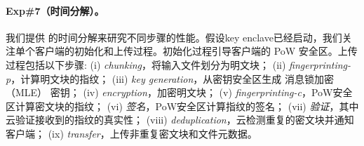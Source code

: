 \paragraph*{Exp\#7（时间分解）。} 我们提供 \sysnameS 的时间分解来研究不同步骤的性能。假设key enclave已经启动，我们关注单个客户端的初始化和上传过程。初始化过程引导客户端的 PoW 安全区。上传过程包括以下步骤: (i) \textit{ chunking}，将输入文件划分为明文块； (ii) \textit{ fingerprinting-p}，计算明文块的指纹； (iii) \textit{ key generation}，从密钥安全区生成 消息锁加密（MLE） 密钥； (iv) \textit{ encryption}，加密明文块； (v) \textit{ fingerprinting-c}，PoW安全区计算密文块的指纹； (vi) \textit{ 签名}，PoW安全区计算指纹的签名； (vii) \textit{ 验证}，其中云验证接收到的指纹的真实性； (viii) \textit{ deduplication}，云检测重复的密文块并通知客户端； (ix) \textit{ transfer}，上传非重复密文块和文件元数据。


